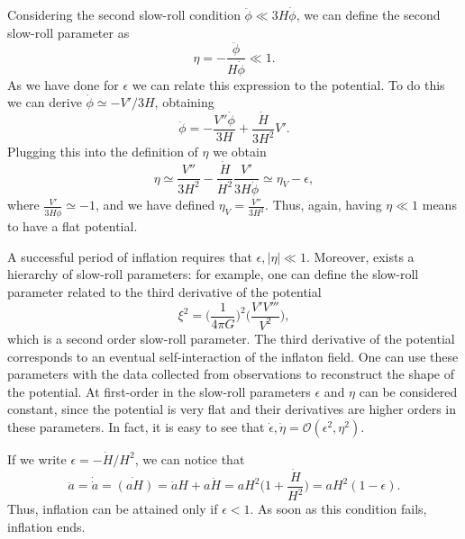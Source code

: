 \documentclass[11pt,a4paper,twoside]{book}
\begin{document}
Considering the second slow-roll condition $ \ddot{\phi} \ll 3H\dot{\phi} $, we can define the second slow-roll parameter as 
\begin{equation}
	\label{etaParameter}
	\eta = - \frac{\ddot{\phi}}{H\dot{\phi}} \ll 1.
\end{equation}
As we have done for $\epsilon$ we can relate this expression to the potential. To do this we can derive $ \dot{\phi} \simeq -V'/3H $, obtaining
\begin{equation}
	\label{phiDerivedEtaParameter}
	\ddot{\phi} = -\frac{V'' \dot{\phi}}{3H} + \frac{\dot{H}}{3H^{2}}V'.
\end{equation}
Plugging this into the definition of $\eta$ we obtain
\begin{equation}
	\label{eta2}
	\eta \simeq \frac{V''}{3H^{2}} - \frac{\dot{H}}{H^{2}}\frac{V'}{3H\dot{\phi}} \simeq \eta_{V} - \epsilon,
\end{equation}
where $ \frac{V'}{3H\dot{\phi}} \simeq -1 $, and we have defined $ \eta_{V}=\frac{V''}{3H^{2}} $. Thus, again, having $\eta \ll 1$ means to have a flat potential.

A successful period of inflation requires that $ \epsilon, |\eta| \ll 1 $. Moreover, exists a hierarchy of slow-roll parameters: for example, one can define the slow-roll parameter related to the third derivative of the potential
\begin{equation}
	\label{secondOrderParameter}
	\xi^{2} = \Big (\frac{1}{4\pi G} \Big )^{2} \Big (\frac{V'V'''}{V^{2}}\Big ),
\end{equation}
which is a second order slow-roll parameter. The third derivative of the potential corresponds to an eventual self-interaction of the inflaton field. 
One can use these parameters with the data collected from observations to reconstruct the shape of the potential.
At first-order in the slow-roll parameters $\epsilon$ and $\eta$ can be considered constant, since the potential is very flat and their derivatives are higher orders in these parameters. In fact, it is easy to see that $ \dot{\epsilon},\dot{\eta} = \mathcal{O}(\epsilon^{2},\eta^{2}) $.

If we write $ \epsilon = - \dot{H}/H^{2} $, we can notice that
\begin{equation}
	\label{scaleFactorParameter}
	\ddot{a}=\dot{\dot{a}}=\dot{(aH)}=\dot{a}H + a\dot{H}=aH^{2}\Big (1+\frac{\dot{H}}{H^{2}}\Big ) = aH^{2}(1-\epsilon) .
\end{equation} 
Thus, inflation can be attained only if $\epsilon < 1$. As soon as this condition fails, inflation ends.
\end{document}
